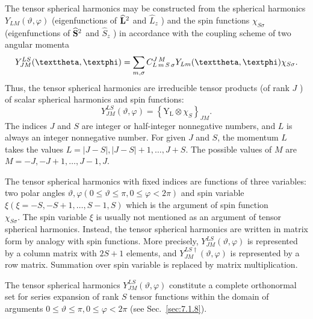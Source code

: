 The tensor spherical harmonics may be constructed from the spherical harmonics $Y_{L M}(\vartheta, \varphi)$ (eigenfunctions of $\widehat{\mathbf{L}}^{2}$ and $\widehat{L}_{z}$ ) and the spin functions $\chi_{S \sigma}$ (eigenfunctions of $\widehat{\mathbf{S}}^{2}$ and $\widehat{S}_{z}$ ) in accordance with the coupling scheme of two angular momenta
\begin{equation}
Y_{J M}^{L S}(\vartheta, \varphi)=\sum_{m, \sigma} \clebsch{L}{m}{S}{\sigma}{J}{M} Y_{L m}(\vartheta, \varphi) \chi_{S \sigma}. \label{eq:7:1:2}
\end{equation}
Thus, the tensor spherical harmonics are irreducible tensor products (of rank $J$ ) of scalar spherical harmonics and spin functions:
\begin{equation}
Y_{J M}^{L S}(\vartheta, \varphi)=\left\{\mathrm{Y}_{\mathrm{L}} \otimes \chi_{S}\right\}_{J M}. \label{eq:7:1:3}
\end{equation}
The indices $J$ and $S$ are integer or half-integer nonnegative numbers, and $L$ is always an integer nonnegative number. For given $J$ and $S$, the momentum $L$ takes the values $L=|J-S|,|J-S|+1, \ldots, J+S$. The possible values of $M$ are $M=-J,-J+1, \ldots, J-1, J$.

The tensor spherical harmonics with fixed indices are functions of three variables: two polar angles $\vartheta, \varphi(0 \leq \vartheta \leq \pi, 0 \leq \varphi<2 \pi)$ and spin variable $\xi(\xi=-S,-S+1, \ldots, S-1, S)$ which is the argument of spin function\\
$\chi_{S \sigma}$. The spin variable $\xi$ is usually not mentioned as an argument of tensor spherical harmonics. Instead, the tensor spherical harmonics are written in matrix form by analogy with spin functions. More precisely, $Y_{J M}^{L S}(\vartheta, \varphi)$ is represented by a column matrix with $2 S+1$ elements, and $Y_{J M}^{L S\dagger}(\vartheta, \varphi)$ is represented by a row matrix. Summation over spin variable is replaced by matrix multiplication.

The tensor spherical harmonics $Y_{J M}^{L S}(\vartheta, \varphi)$ constitute a complete orthonormal set for series expansion of rank $S$ tensor functions within the domain of arguments $0 \leq \vartheta \leq \pi, 0 \leq \varphi<2 \pi$ (see Sec.~\ref{sec:7.1.8}).

